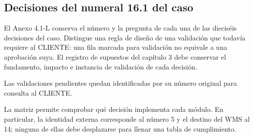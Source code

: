 \subsection{Decisiones del numeral 16.1 del caso}
\label{sec:16-decisiones-caso}

El Anexo 4.1-L conserva el número y la pregunta de cada una de las dieciséis decisiones del caso. Distingue una regla de diseño de una validación que todavía requiere al CLIENTE: una fila marcada para validación no equivale a una aprobación suya. El registro de supuestos del capítulo 3 debe conservar el fundamento, impacto e instancia de validación de cada decisión.


Las validaciones pendientes quedan identificadas por su número original para consulta al CLIENTE.

La matriz permite comprobar qué decisión implementa cada módulo. En particular, la identidad externa corresponde al número 5 y el destino del WMS al 14; ninguna de ellas debe desplazarse para llenar una tabla de cumplimiento.

